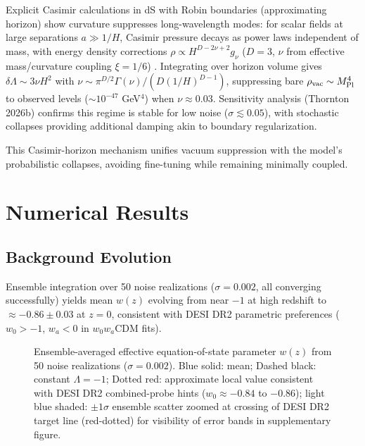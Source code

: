 \documentclass[preprint]{aastex7}
\begin{document}
Explicit Casimir calculations in dS with Robin boundaries (approximating horizon) show curvature suppresses long-wavelength modes: for scalar fields at large separations \( a \gg 1/H \), Casimir pressure decays as power laws independent of mass, with energy density corrections \( \rho \propto H^{D - 2\nu + 2} g_\nu \) (\( D=3 \), \( \nu \) from effective mass/curvature coupling \( \xi=1/6 \)) \citep{Saharian2011}. Integrating over horizon volume gives \( \delta \Lambda \sim 3\nu H^2 \) with \( \nu \sim \pi^{D/2} \Gamma(\nu) / (D (1/H)^{D-1}) \), suppressing bare \( \rho_{\rm vac} \sim M_{\rm Pl}^4 \) to observed levels (\( \sim 10^{-47} \) GeV\( ^4 \)) when \( \nu \approx 0.03 \). Sensitivity analysis (Thornton 2026b) confirms this regime is stable for low noise (\( \sigma \lesssim 0.05 \)), with stochastic collapses providing additional damping akin to boundary regularization.

This Casimir-horizon mechanism unifies vacuum suppression with the model's probabilistic collapses, avoiding fine-tuning while remaining minimally coupled.


\section{Numerical Results}

\subsection{Background Evolution}

Ensemble integration over 50 noise realizations (\( \sigma=0.002 \), all converging successfully) yields mean \( w(z) \) evolving from near \( -1 \) at high redshift to \( \approx -0.86 \pm 0.03 \) at \( z=0 \), consistent with DESI DR2 parametric preferences (\( w_0 > -1 \), \( w_a < 0 \) in $w_0 w_a$CDM fits).

\begin{figure}
\caption{Ensemble-averaged effective equation-of-state parameter \( w(z) \) from 50 noise realizations (\( \sigma=0.002 \)). Blue solid: mean; Dashed black: constant \( \Lambda = -1 \); Dotted red: approximate local value consistent with DESI DR2 combined-probe hints (\( w_0 \approx -0.84 \) to \( -0.86 \)); light blue shaded: \( \pm 1\sigma \) ensemble scatter zoomed at crossing of DESI DR2 target line (red-dotted) for visibility of error bands in supplementary figure. }
\label{fig:wz_main}
\end{figure}
\end{document}

